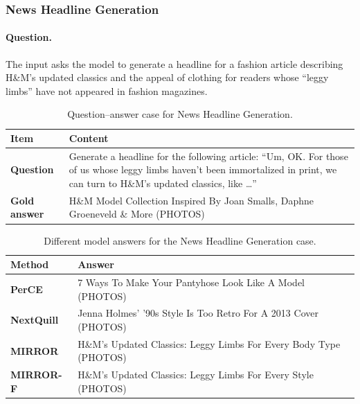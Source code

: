 \documentclass{article} %
\begin{document}
\subsubsection{News Headline Generation}

\paragraph{Question.}
The input asks the model to generate a headline for a fashion article describing H\&M's updated classics and the appeal of clothing for readers whose ``leggy limbs'' have not appeared in fashion magazines.

\begin{table}[t]
\centering
\small
\caption{Question--answer case for News Headline Generation.}
\label{tab:case_news_qa}
\begin{tabular}{p{}p{}}
\toprule
\textbf{Item} & \textbf{Content} \\
\midrule
\textbf{Question}
&
Generate a headline for the following article: ``Um, OK. For those of us whose leggy limbs haven't been immortalized in print, we can turn to H\&M's updated classics, like \ldots'' \\[2mm]

\textbf{Gold answer}
&
H\&M Model Collection Inspired By Joan Smalls, Daphne Groeneveld \& More (PHOTOS) \\
\bottomrule
\end{tabular}
\end{table}

\begin{table}[t]
\centering
\small
\caption{Different model answers for the News Headline Generation case.}
\label{tab:case_news_answers}
\begin{tabular}{p{}p{}}
\toprule
\textbf{Method} & \textbf{Answer} \\
\midrule
\textbf{PerCE}
&
7 Ways To Make Your Pantyhose Look Like A Model (PHOTOS) \\[2mm]

\textbf{NextQuill}
&
Jenna Holmes' '90s Style Is Too Retro For A 2013 Cover (PHOTOS) \\[2mm]

\textbf{MIRROR}
&
H\&M's Updated Classics: Leggy Limbs For Every Body Type (PHOTOS) \\[2mm]

\textbf{MIRROR-F}
&
H\&M's Updated Classics: Leggy Limbs For Every Style (PHOTOS) \\
\bottomrule
\end{tabular}
\end{table}
\end{document}
